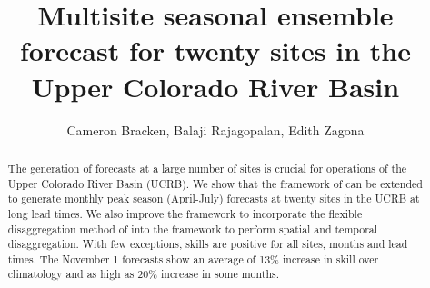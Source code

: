 \documentclass[final,5p,times,twocolumn,authoryear]{elsarticle}
\begin{document}
\begin{frontmatter}



\title{Multisite seasonal ensemble forecast for twenty sites in the Upper Colorado River Basin}


\author{Cameron Bracken, Balaji Rajagopalan, Edith Zagona}

\address{}

\begin{abstract}
The generation of forecasts at a large number of sites is crucial for operations of the Upper Colorado River Basin (UCRB). We show that the framework of \cite{Bracken:2010cw} can be extended to generate monthly peak season (April-July) forecasts at twenty sites in the UCRB at long lead times. We also improve the framework to incorporate the flexible disaggregation method of \cite{Nowak:2010ha} into the framework to perform spatial and temporal disaggregation. With few exceptions, skills are positive for all sites, months and lead times. The November 1 forecasts show an average of 13\% increase in skill over climatology and as high as 20\% increase in some months. 
\end{abstract}

\begin{keyword}


\end{keyword}

\end{frontmatter}
\end{document}
